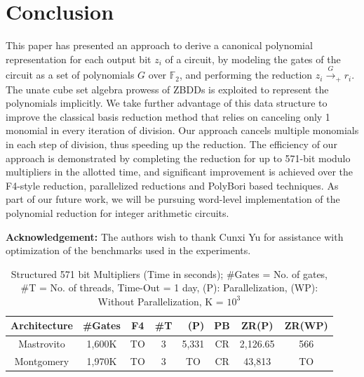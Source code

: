 
\section{Conclusion}
This paper has presented an approach to derive a canonical polynomial
representation for each output bit $z_i$ of a circuit, by modeling the gates
of the circuit as a set of polynomials $G$ over $\mathbb{F}_2$, and
performing the reduction $z_i\xrightarrow{G}_+ r_i$. 
The unate cube set algebra prowess of ZBDDs is exploited to represent
the polynomials implicitly. We take further advantage of this
data structure to improve the classical \Grobner basis reduction
method that relies on canceling only 1 monomial in every iteration
of division. Our approach cancels multiple monomials in each step of
division, thus speeding up the reduction. 
The  efficiency of our approach is demonstrated by completing  the
reduction for up to 571-bit modulo multipliers in the allotted time,
and significant improvement is achieved over the F4-style reduction,
parallelized reductions and  PolyBori based techniques. As part of our future work, we will be
pursuing word-level implementation of the polynomial reduction
for integer arithmetic circuits.  
\par \textbf{Acknowledgement:} The authors wish to thank Cunxi Yu for 
assistance with optimization of the
benchmarks used in the experiments. 
% 
\iffalse
\begin{table}[H]
\centering
\caption{Structured 571 bit Multipliers (Time in seconds);  \#Gates = No. of gates, \#T = No. of threads, Time-Out = 1 day, (P): Parallelization, (WP): Without Parallelization, K = $10^3$}
\label{montmmsyn}
\begin{tabular}{| c | c | c | c | c | c | c | c |} \hline
\textbf{Architecture} & \textbf{\#Gates}&\textbf{F4} & \textbf{\#T} & \textbf{~\cite{cunxi:aspdac17}(P)} & \textbf{PB} & \textbf{ZR(P)} & \textbf{ZR(WP)} \\ \hline
Mastrovito&1,600K&TO&3&5,331&CR&2,126.65&566 \\ \hline
Montgomery&1,970K&TO&3&TO&CR&43,813&TO \\ \hline
\end{tabular}
\end{table}
